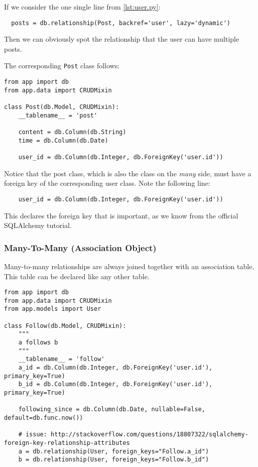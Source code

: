 \documentclass[../main/main.tex]{subfiles}
\begin{document}
If we consider the one single line from \ref{lst:user.py}:

\begin{lstlisting}
  posts = db.relationship(Post, backref='user', lazy='dynamic')  
\end{lstlisting}

Then we can obviously spot the relationship that the user can have
multiple posts. 

The corresponding \lstinline|Post| class follows: 

\begin{lstlisting}[caption=app/models/post.py, label=post.py]
from app import db
from app.data import CRUDMixin

class Post(db.Model, CRUDMixin):
    __tablename__ = 'post'

    content = db.Column(db.String)
    time = db.Column(db.Date)

    user_id = db.Column(db.Integer, db.ForeignKey('user.id'))
\end{lstlisting}

Notice that the post class, which is also the class on the
\textit{many} side, must have a foreign key of the corresponding user
class. Note the following line: 

\begin{lstlisting}
    user_id = db.Column(db.Integer, db.ForeignKey('user.id'))  
\end{lstlisting}

This declares the foreign key that is important, as we know from the
official SQLAlchemy tutorial. 


\subsubsection{Many-To-Many (Association Object)}
\label{sec:manytomany}

Many-to-many relationships are always joined together with an
association table. This table can be declared like any other table. 


\begin{lstlisting}
from app import db
from app.data import CRUDMixin
from app.models import User

class Follow(db.Model, CRUDMixin):
    """
    a follows b
    """
    __tablename__ = 'follow'
    a_id = db.Column(db.Integer, db.ForeignKey('user.id'), primary_key=True)
    b_id = db.Column(db.Integer, db.ForeignKey('user.id'), primary_key=True)

    following_since = db.Column(db.Date, nullable=False, default=db.func.now())

    # issue: http://stackoverflow.com/questions/18807322/sqlalchemy-foreign-key-relationship-attributes
    a = db.relationship(User, foreign_keys="Follow.a_id")
    b = db.relationship(User, foreign_keys="Follow.b_id")
\end{lstlisting}
\end{document}
